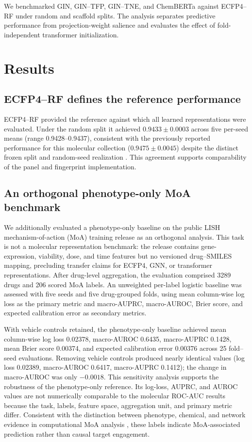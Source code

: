 \documentclass[11pt,a4paper]{article}
\begin{document}
We benchmarked GIN, GIN--TFP, GIN--TNE, and ChemBERTa against ECFP4--RF under random and scaffold splits. The analysis separates predictive performance from projection-weight salience and evaluates the effect of fold-independent transformer initialization.

\section{Results}

\subsection{ECFP4--RF defines the reference performance}

ECFP4--RF provided the reference against which all learned representations were evaluated. Under the random split it achieved $\num{0.9433} \pm \num{0.0003}$ across five per-seed means (range \num{0.9428}--\num{0.9437}), consistent with the previously reported performance for this molecular collection ($\num{0.9475} \pm \num{0.0045}$) despite the distinct frozen split and random-seed realization \citep{temgoua2027quantum}. This agreement supports comparability of the panel and fingerprint implementation.

\subsection{An orthogonal phenotype-only MoA benchmark}

We additionally evaluated a phenotype-only baseline on the public LISH mechanism-of-action (MoA) training release as an orthogonal analysis. This task is not a molecular representation benchmark: the release contains gene-expression, viability, dose, and time features but no versioned drug--SMILES mapping, precluding transfer claims for ECFP4, GNN, or transformer representations. After drug-level aggregation, the evaluation comprised \num{3289} drugs and \num{206} scored MoA labels. An unweighted per-label logistic baseline was assessed with five seeds and five drug-grouped folds, using mean column-wise log loss as the primary metric and macro-AUPRC, macro-AUROC, Brier score, and expected calibration error as secondary metrics.

With vehicle controls retained, the phenotype-only baseline achieved mean column-wise log loss \num{0.02378}, macro-AUROC \num{0.6435}, macro-AUPRC \num{0.1428}, mean Brier score \num{0.00374}, and expected calibration error \num{0.00376} across \num{25} fold--seed evaluations. Removing vehicle controls produced nearly identical values (log loss \num{0.02389}, macro-AUROC \num{0.6417}, macro-AUPRC \num{0.1412}); the change in macro-AUROC was only $-\num{0.0018}$. This sensitivity analysis supports the robustness of the phenotype-only reference. Its log-loss, AUPRC, and AUROC values are not numerically comparable to the molecular ROC-AUC results because the task, labels, feature space, aggregation unit, and primary metric differ. Consistent with the distinction between phenotype, chemical, and network evidence in computational MoA analysis \citep{Trapotsi2022MoA}, these labels indicate MoA-associated prediction rather than causal target engagement.
\end{document}
